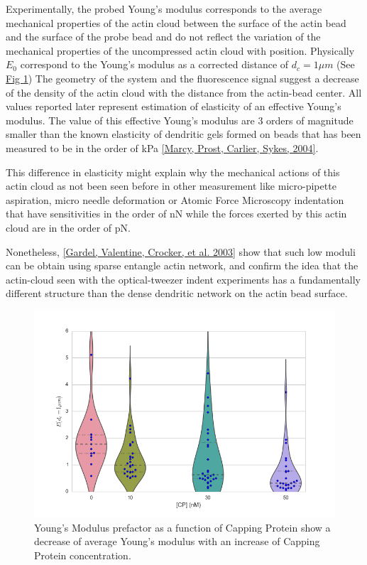 \documentclass[A4paperpaper,11pt,english]{sphinxmanual}
\begin{document}
Experimentally, the probed Young's modulus corresponds to the average mechanical
properties of the actin cloud between the surface of the actin bead and the
surface of the probe bead and do not reflect the variation of the mechanical
properties of the uncompressed actin cloud with position.
Physically \(E_0\) correspond to the Young's modulus as a corrected distance of \(d_c = 1 \mu{}m\)
(See \hyperref[index-latex:ev]{Fig  \ref*{index-latex:ev}})
The geometry of the
system and the fluorescence signal suggest a decrease of the density of the
actin cloud with the distance from the actin-bead center. All values
reported later represent estimation of elasticity of an effective Young's
modulus. The value of this effective Young's modulus are 3 orders of magnitude
smaller than the known elasticity of dendritic gels formed on beads that has been measured to be in the
order of kPa {\hyperref[index-latex:marcy2004]{{[}Marcy, Prost, Carlier, Sykes,  2004{]}}}.

This difference in elasticity might explain why the mechanical actions of this actin cloud as not been
seen before in other measurement like micro-pipette aspiration,
micro needle deformation or Atomic Force Microscopy indentation that have
sensitivities in the order of nN while the forces exerted by this actin cloud
are in the order of pN.

Nonetheless, {\hyperref[index-latex:gardel2003]{{[}Gardel, Valentine, Crocker,  et al.  2003{]}}} show that such low moduli can be obtain using
sparse entangle actin network, and confirm the idea that the actin-cloud seen
with the optical-tweezer indent experiments has a fundamentally different
structure than the dense dendritic network on the actin
bead surface.
\begin{figure}[htbp]
\centering
\capstart

\includegraphics[width=0.800\linewidth]{E0_violin.png}
\caption{Young's Modulus prefactor as a function of Capping Protein show a decrease of
average Young's modulus with an increase of Capping Protein concentration.}\label{index-latex:ev}\end{figure}
\end{document}
